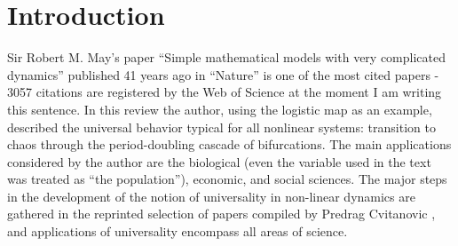 \documentclass[graybox]{svmult}
\begin{document}

\section{Introduction}
\label{sec:1}
Sir Robert M. May's paper ``Simple mathematical models with very complicated
dynamics'' published 41 years ago in ``Nature'' \cite{May} is one of the
most cited papers - 3057 citations are registered by the Web of Science 
at the moment I am writing this sentence. In this review the author, using the
logistic map as an example, described the universal behavior typical
for all nonlinear systems: transition to chaos through the period-doubling
cascade of bifurcations. The main applications considered by the author
are the biological (even the variable used in the text was treated as ``the
 population''), economic, and social sciences. The major
steps in the development of the notion of universality in non-linear
dynamics are gathered in the reprinted selection of papers compiled
by Predrag Cvitanovic \cite{Cvi}, and applications of 
universality encompass all areas of science.
\end{document}
